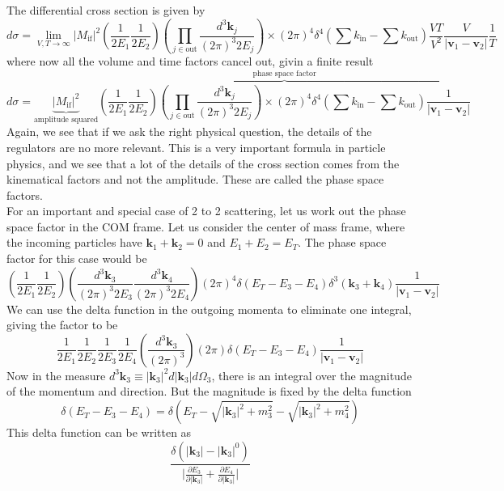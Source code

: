 \documentclass[11pt]{article}
\newcommand{\del}{\partial}
\numberwithin{equation}{section}
\begin{document}
    The differential cross section is given by 
    \begin{equation*}
        d\sigma = \lim_{V,T\to \infty} |M_{\text{if}}|^2 \left(\frac{1}{2E_1}\frac{1}{2E_2} \right)\left(\prod_{j\in\text{out}}\frac{d^3\textbf{k}_j}{(2\pi)^3 2E_j}\right) \times (2\pi)^4\delta^4\left(\sum k_{\text{in}} - \sum k_{\text{out}} \right)\frac{VT}{V^2}  \frac{V}{|\textbf{v}_1 - \textbf{v}_2|}\frac{1}{T}
    \end{equation*}
    where now all the volume and time factors cancel out, givin a finite result
    \begin{equation*}
        d\sigma =  \underbrace{|M_{\text{if}}|^2}_{\text{amplitude squared}}\overbrace{\left(\frac{1}{2E_1}\frac{1}{2E_2} \right)\left(\prod_{j\in\text{out}}\frac{d^3\textbf{k}_j}{(2\pi)^3 2E_j}\right) \times (2\pi)^4\delta^4\left(\sum k_{\text{in}} - \sum k_{\text{out}}\right)\frac{1}{|\textbf{v}_1 - \textbf{v}_2|}}^{\text{phase space factor}}
    \end{equation*}
    Again, we see that if we ask the right physical question, the details of the regulators are no more relevant. This is a very important formula in particle physics, and we see that a lot of the details of the cross section comes from the kinematical factors and not the amplitude. These are called the phase space factors.\\

    For an important and special case of 2 to 2 scattering, let us work out the phase space factor in the COM frame.
    Let us consider the center of mass frame, where the incoming particles have \(\textbf{k}_1 + \textbf{k}_2 = 0\) and \(E_1 + E_2 = E_T\). The phase space factor for this case would be 
    \begin{equation*}
            \left(\frac{1}{2E_1}\frac{1}{2E_2} \right)\left(\frac{d^3\textbf{k}_3}{(2\pi)^3 2E_3}\frac{d^3\textbf{k}_4}{(2\pi)^3 2E_4}\right)(2\pi)^4\delta(E_T - E_3 - E_4)\delta^3\left(\textbf{k}_3 + \textbf{k}_4\right)\frac{1}{|\textbf{v}_1 - \textbf{v}_2|}
    \end{equation*}
    We can use the delta function in the outgoing momenta to eliminate one integral, giving the factor to be 
    \begin{equation*}
        \frac{1}{2E_1}\frac{1}{2E_2}\frac{1}{2E_3}\frac{1}{2E_4}\left(\frac{d^3\textbf{k}_3}{(2\pi)^3}\right)(2\pi)\delta(E_T - E_3 - E_4)\frac{1}{|\textbf{v}_1 - \textbf{v}_2|}
    \end{equation*}
    Now in the measure \(d^3\textbf{k}_3 \equiv |\textbf{k}_3|^2 d|\textbf{k}_3| d\Omega_3\), there is an integral over the magnitude of the momentum and direction. But the magnitude is fixed by the delta function 
    \begin{equation*}
        \delta(E_T - E_3 - E_4) = \delta\left(E_T - \sqrt{|\textbf{k}_3|^2 + m_3^2} - \sqrt{|\textbf{k}_3|^2 + m_4^2}\right)
    \end{equation*}
    This delta function can be written as 
    \begin{equation*}
        \displaystyle \frac{\delta\left(|\textbf{k}_3| - |\textbf{k}_3|^0\right)}{\bigg|\displaystyle \frac{\del E_3}{\del |\textbf{k}_3|} + \frac{\del E_4}{\del |\textbf{k}_3|}\bigg|}
    \end{equation*}
\end{document}
